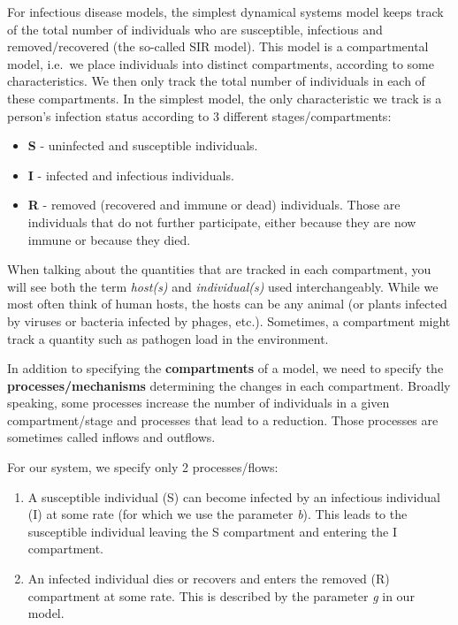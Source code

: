 \documentclass[
]{book}
\providecommand{\tightlist}{%
  \setlength{\itemsep}{0pt}\setlength{\parskip}{0pt}}
\begin{document}
For infectious disease models, the simplest dynamical systems model keeps track of the total number of individuals who are susceptible, infectious and removed/recovered (the so-called SIR model). This model is a compartmental model, i.e.~we place individuals into distinct compartments, according to some characteristics. We then only track the total number of individuals in each of these compartments. In the simplest model, the only characteristic we track is a person's infection status according to 3 different stages/compartments:

\begin{itemize}
\tightlist
\item
  \textbf{S} - uninfected and susceptible individuals.
\item
  \textbf{I} - infected and infectious individuals.
\item
  \textbf{R} - removed (recovered and immune or dead) individuals. Those are individuals that do not further participate, either because they are now immune or because they died.
\end{itemize}

When talking about the quantities that are tracked in each compartment, you will see both the term \emph{host(s)} and \emph{individual(s)} used interchangeably. While we most often think of human hosts, the hosts can be any animal (or plants infected by viruses or bacteria infected by phages, etc.). Sometimes, a compartment might track a quantity such as pathogen load in the environment.

In addition to specifying the \textbf{compartments} of a model, we need to specify the \textbf{processes/mechanisms} determining the changes in each compartment. Broadly speaking, some processes increase the number of individuals in a given compartment/stage and processes that lead to a reduction. Those processes are sometimes called inflows and outflows.

For our system, we specify only 2 processes/flows:

\begin{enumerate}
\def\labelenumi{\arabic{enumi}.}
\tightlist
\item
  A susceptible individual (S) can become infected by an infectious individual (I) at some rate (for which we use the parameter \emph{b}). This leads to the susceptible individual leaving the S compartment and entering the I compartment.\\
\item
  An infected individual dies or recovers and enters the removed (R) compartment at some rate. This is described by the parameter \emph{g} in our model.
\end{enumerate}
\end{document}
